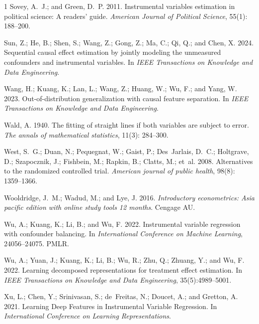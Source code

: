 \documentclass[journal]{IEEEtran}
\begin{document}
\begin{thebibliography}{1}
Sovey, A.~J.; and Green, D.~P. 2011.
\newblock Instrumental variables estimation in political science: A readers’ guide.
\newblock \emph{American Journal of Political Science}, 55(1): 188--200.


Sun, Z.; He, B.; Shen, S.; Wang, Z.; Gong, Z.; Ma, C.; Qi, Q.; and Chen, X. 2024.
\newblock Sequential causal effect estimation by jointly modeling the unmeasured confounders and instrumental variables.
\newblock In \emph{IEEE Transactions on Knowledge and Data Engineering}.

Wang, H.; Kuang, K.; Lan, L.; Wang, Z.; Huang, W.; Wu, F.; and Yang, W. 2023.
\newblock Out-of-distribution generalization with causal feature separation.
\newblock In \emph{IEEE Transactions on Knowledge and Data Engineering}.

Wald, A. 1940.
\newblock The fitting of straight lines if both variables are subject to error.
\newblock \emph{The annals of mathematical statistics}, 11(3): 284--300.

West, S.~G.; Duan, N.; Pequegnat, W.; Gaist, P.; Des~Jarlais, D.~C.; Holtgrave, D.; Szapocznik, J.; Fishbein, M.; Rapkin, B.; Clatts, M.; et~al. 2008.
\newblock Alternatives to the randomized controlled trial.
\newblock \emph{American journal of public health}, 98(8): 1359--1366.

Wooldridge, J.~M.; Wadud, M.; and Lye, J. 2016.
\newblock \emph{Introductory econometrics: Asia pacific edition with online study tools 12 months}.
\newblock Cengage AU.

Wu, A.; Kuang, K.; Li, B.; and Wu, F. 2022.
\newblock Instrumental variable regression with confounder balancing.
\newblock In \emph{International Conference on Machine Learning}, 24056--24075. PMLR.


Wu, A.; Yuan, J.; Kuang, K.; Li, B.; Wu, R.; Zhu, Q.; Zhuang, Y.; and Wu, F. 2022.
\newblock Learning decomposed representations for treatment effect estimation.
\newblock In \emph{IEEE Transactions on Knowledge and Data Engineering}, 35(5):4989--5001.

Xu, L.; Chen, Y.; Srinivasan, S.; de~Freitas, N.; Doucet, A.; and Gretton, A. 2021.
\newblock Learning Deep Features in Instrumental Variable Regression.
\newblock In \emph{International Conference on Learning Representations}.


\end{thebibliography}
\end{document}
